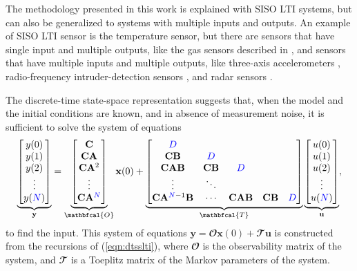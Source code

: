 The methodology presented in this work is explained with SISO LTI systems, but can also be generalized to systems with multiple inputs and outputs.
An example of SISO LTI sensor is the temperature sensor, but there are sensors that have single input and multiple outputs, like the gas sensors described in \citet{Munther19}, and sensors that have multiple inputs and multiple outputs, like three-axis accelerometers \citet{DEmilia16}, radio-frequency intruder-detection sensors \citet{Ushiki13}, and radar sensors \citet{Kueppers17}. 

The discrete-time state-space representation suggests that, when the model and the initial conditions are known, and in absence of measurement noise, it is sufficient to solve the system of equations 
\begin{equation} 
\underbrace{ \begin{bmatrix} y(0) \\ y(1) \\ y(2) \\ \vdots \\ y(\color{blue}N\color{black}) \end{bmatrix} }_{\mathbf{y}}
 = \underbrace{ \begin{bmatrix} \mathbf{C} \\ \mathbf{C} \mathbf{A} \\ \mathbf{C} \mathbf{A}^2 \\ \vdots \\ \mathbf{C} \mathbf{A}^{\color{blue}N\color{black}} \end{bmatrix} }_{\mathbfcal{O}} \mathbf{x}(0) +
 \underbrace{ \begin{bmatrix} \color{blue}D\color{black} \\ \mathbf{C} \mathbf{B} & \color{blue}D\color{black} \\ \mathbf{C} \mathbf{A} \mathbf{B} & \mathbf{C} \mathbf{B} & \color{blue}D\color{black} \\ \vdots & \ddots \\ \mathbf{C} \mathbf{A}^{\color{blue}N\color{black}-1} \mathbf{B} & \cdots  &  \mathbf{C} \mathbf{A} \mathbf{B} & \mathbf{C} \mathbf{B} & \color{blue}D\color{black} \end{bmatrix} }_{\mathbfcal{T}} \underbrace{ \begin{bmatrix} u(0) \\ u(1) \\ u(2) \\ \vdots \\ u(\color{blue}N\color{black}) \end{bmatrix} }_{\mathbf{u}} ,
 \label{eqn:knownmodel} \end{equation}
to find the input. 
This system of equations $\mathbf{y} = \mathbfcal{O} \mathbf{x}(0) + \mathbfcal{T} \mathbf{u}$ is constructed from the recursions of (\ref{eqn:dtsslti}), where $\mathbfcal{O}$ is the observability matrix of the system, and $\mathbfcal{T}$ is a Toeplitz matrix of the Markov parameters of the system.

